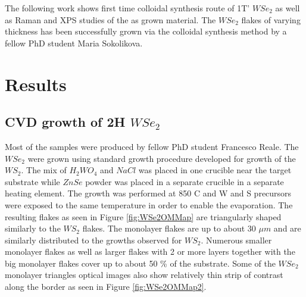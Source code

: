 The following work shows first time colloidal synthesis route of 1T' $WSe_2$ as well as Raman and XPS studies of the as grown material. The $WSe_2$ flakes of varying thickness has been successfully grown via the colloidal synthesis method by a fellow PhD student Maria Sokolikova.
	
\section{Results}

\subsection{CVD growth of 2H $WSe_2$}

Most of the samples were produced by fellow PhD student Francesco Reale. The $WSe_2$ were grown using standard growth procedure developed for growth of the $WS_2$. The mix of $H_2WO_4$ and $NaCl$ was placed in one crucible near the target substrate while $ZnSe$ powder was placed in a separate crucible in a separate heating element. The growth was performed at 850 {\degree}C and W and S precursors were exposed to the same temperature in order to enable the evaporation. The resulting flakes as seen in Figure \ref{fig:WSe2OMMap} are triangularly shaped similarly to the $WS_2$ flakes. The monolayer flakes are up to about 30 $\mu m$ and are similarly distributed to the growths observed for $WS_2$. Numerous smaller monolayer flakes as well as larger flakes with 2 or more layers together with the big monolayer flakes cover up to about 50 \% of the substrate. Some of the $WSe_2$ monolayer triangles optical images also show relatively thin strip of contrast along the border as seen in Figure \ref{fig:WSe2OMMap2}.

